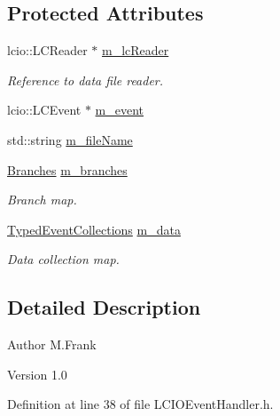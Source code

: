 \subsection*{Protected Attributes}
\begin{DoxyCompactItemize}
\item 
lcio::LCReader $\ast$ \hyperlink{class_d_d4hep_1_1_l_c_i_o_event_handler_ae350f66667954755d793b2e4a41adbba}{m\_\-lcReader}
\begin{DoxyCompactList}\small\item\em Reference to data file reader. \item\end{DoxyCompactList}\item 
lcio::LCEvent $\ast$ \hyperlink{class_d_d4hep_1_1_l_c_i_o_event_handler_a8ec477793e0d557bb46f65953c9366d2}{m\_\-event}
\item 
std::string \hyperlink{class_d_d4hep_1_1_l_c_i_o_event_handler_ad46f1b438e65d08e5ebbe5bb8df25347}{m\_\-fileName}
\item 
\hyperlink{class_d_d4hep_1_1_l_c_i_o_event_handler_abb97052600fb229e9fdc6cfeefdc4177}{Branches} \hyperlink{class_d_d4hep_1_1_l_c_i_o_event_handler_affa8da5c2619446e0e5c5cf9d4ad3d69}{m\_\-branches}
\begin{DoxyCompactList}\small\item\em Branch map. \item\end{DoxyCompactList}\item 
\hyperlink{class_d_d4hep_1_1_event_handler_a4d441ff8a824b1e2f278e8b7a6391af3}{TypedEventCollections} \hyperlink{class_d_d4hep_1_1_l_c_i_o_event_handler_aad03bcadad9458ec37c9e13209481595}{m\_\-data}
\begin{DoxyCompactList}\small\item\em Data collection map. \item\end{DoxyCompactList}\end{DoxyCompactItemize}


\subsection{Detailed Description}
\begin{DoxyAuthor}{Author}
M.Frank 
\end{DoxyAuthor}
\begin{DoxyVersion}{Version}
1.0 
\end{DoxyVersion}


Definition at line 38 of file LCIOEventHandler.h.


